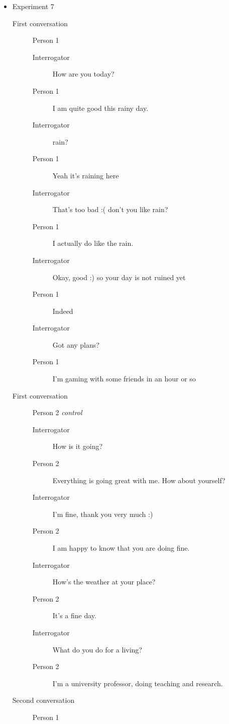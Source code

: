 \begin{itemize}
   \item Experiment 7
      \begin{description}
         \item [First conversation] Person 1
            \begin{description}
               \item [Interrogator] How are you today?
               \item [Person 1] I am quite good this rainy day.
               \item [Interrogator] rain?
               \item [Person 1] Yeah it's raining here
               \item [Interrogator] That's too bad :( don't you like rain?
               \item [Person 1] I actually do like the rain.
               \item [Interrogator] Okay, good :) so your day is not ruined yet
               \item [Person 1] Indeed
               \item [Interrogator] Got any plans?
               \item [Person 1] I'm gaming with some friends in an hour or so
            \end{description}
         \item [First conversation] Person 2 \textit{control}
            \begin{description}
               \item [Interrogator] How is it going?
               \item [Person 2] Everything is going great with me. How about yourself?
               \item [Interrogator] I'm fine, thank you very much :)
               \item [Person 2] I am happy to know that you are doing fine.
               \item [Interrogator] How's the weather at your place?
               \item [Person 2] It's a fine day.
               \item [Interrogator] What do you do for a living?
               \item [Person 2] I'm a university professor, doing teaching and research.
            \end{description}
         \item [Second conversation] Person 1
            \begin{description}

\end{description}
\end{description}
\end{itemize}
